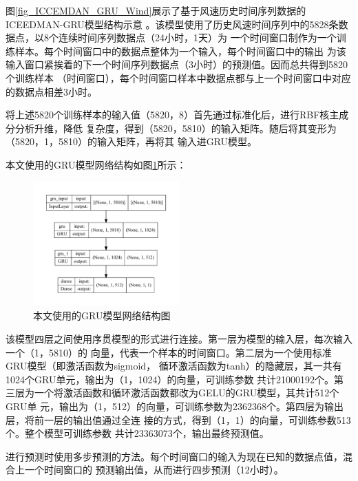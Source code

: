 \documentclass[AutoFakeBold]{LZUThesis}
\begin{document}
图\ref{fig_ICCEMDAN_GRU_Wind}展示了基于风速历史时间序列数据的ICEEDMAN-GRU模型结构示意
。该模型使用了历史风速时间序列中的5828条数据点，以8个连续时间序列数据点（24小时，1天）为
一个时间窗口制作为一个训练样本。每个时间窗口中的数据点整体为一个输入，每个时间窗口中的输出
为该输入窗口紧挨着的下一个时间序列数据点（3小时）的预测值。因而总共得到5820个训练样本
（时间窗口），每个时间窗口样本中数据点都与上一个时间窗口中对应的数据点相差3小时。

将上述5820个训练样本的输入值（5820，8）首先通过标准化后，进行RBF核主成分分析升维，降低
复杂度，得到（5820，5810）的输入矩阵。随后将其变形为（5820，1，5810）的输入矩阵，再将其
输入进GRU模型。

本文使用的GRU模型网络结构如图\ref{fig_gru}所示：

\begin{figure}[H]
	\centering
    \includegraphics[width=0.5\textwidth]{figures/wind_grumodel_plot.pdf}
    \caption{本文使用的GRU模型网络结构图}
    \label{fig_gru}
\end{figure}

该模型四层之间使用序贯模型的形式进行连接。第一层为模型的输入层，每次输入一个（1，5810）的
向量，代表一个样本的时间窗口。第二层为一个使用标准GRU模型（即激活函数为sigmoid，
循环激活函数为tanh）的隐藏层，其一共有1024个GRU单元，输出为（1，1024）的向量，可训练参数
共计21000192个。第三层为一个将激活函数和循环激活函数都改为GELU的GRU模型，其共计512个GRU单
元，输出为（1，512）的向量，可训练参数为2362368个。第四层为输出层，将前一层的输出值通过全连
接的方式，得到（1，1）的向量，可训练参数513个。整个模型可训练参数
共计23363073个，输出最终预测值。

进行预测时使用多步预测的方法。每个时间窗口的输入为现在已知的数据点值，混合上一个时间窗口的
预测输出值，从而进行四步预测（12小时）。
\end{document}
